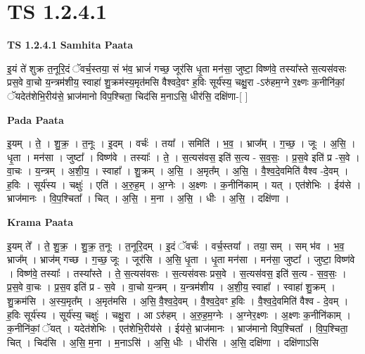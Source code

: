 \documentclass[17pt]{extarticle}
\begin{document}
\section{ TS 1.2.4.1 }

\textbf{TS 1.2.4.1 } \newline
\textbf{Samhita Paata} \newline

इ॒यं ते॑ शुक्र त॒नूरि॒दं ॅवर्च॒स्तया॒ सं भ॑व॒ भ्राजं॑ गच्छ॒ जूर॑सि धृ॒ता मन॑सा॒ जुष्टा॒ विष्ण॑वे॒ तस्या᳚स्ते स॒त्यस॑वसः प्रस॒वे वा॒चो य॒न्त्रम॑शीय॒ स्वाहा॑ शु॒क्रम॑स्य॒मृत॑मसि वैश्वदे॒वꣳ ह॒विः सूर्य॑स्य॒ चक्षु॒रा -ऽरु॑हम॒ग्ने र॒क्ष्णः क॒नीनि॑कां॒ ॅयदेत॑शेभि॒रीय॑से॒ भ्राज॑मानो विप॒श्चिता॒ चिद॑सि म॒नाऽसि॒ धीर॑सि॒ दक्षि॑णा-[ ] \newline

\textbf{Pada Paata} \newline

इ॒यम् । ते॒ । शु॒क्र॒ । त॒नूः । इ॒दम् । वर्चः॑ । तया᳚ । समिति॑ । भ॒व॒ । भ्राज᳚म् । ग॒च्छ॒ । जूः । अ॒सि॒ । धृ॒ता । मन॑सा । जुष्टा᳚ । विष्ण॑वे । तस्याः᳚ । ते॒ । स॒त्यस॑वस॒ इति॑ स॒त्य - स॒व॒सः॒ । प्र॒स॒वे इति॑ प्र -स॒वे । वा॒चः । य॒न्त्रम् । अ॒शी॒य॒ । स्वाहा᳚ । शु॒क्रम् । अ॒सि॒ । अ॒मृत᳚म् । अ॒सि॒ । वै॒श्व॒दे॒वमिति॑ वैश्व -दे॒वम् । ह॒विः । सूर्य॑स्य । चक्षुः॑ । एति॑ । अ॒रु॒ह॒म् । अ॒ग्नेः । अ॒क्ष्णः । क॒नीनि॑काम् । यत् । एत॑शेभिः । ईय॑से । भ्राज॑मानः । वि॒प॒श्चिता᳚ । चित् । अ॒सि॒ । म॒ना । अ॒सि॒ । धीः । अ॒सि॒ । दक्षि॑णा ।  \newline


\textbf{Krama Paata} \newline

इ॒यम् ते᳚ । ते॒ शु॒क्र॒ । शु॒क्र॒ त॒नूः । त॒नूरि॒दम् । इ॒दं ॅवर्चः॑ । वर्च॒स्तया᳚ । तया॒ सम् । सम् भ॑व । भ॒व॒ भ्राज᳚म् । भ्राज॑म् गच्छ । ग॒च्छ॒ जूः । जूर॑सि । अ॒सि॒ धृ॒ता । धृ॒ता मन॑सा । मन॑सा॒ जुष्टा᳚ । जुष्टा॒ विष्ण॑वे । विष्ण॑वे॒ तस्याः᳚ । तस्या᳚स्ते । ते॒ स॒त्यस॑वसः । स॒त्यस॑वसः प्रस॒वे । स॒त्यस॑वस॒ इति॑ स॒त्य - स॒व॒सः॒ । प्र॒स॒वे वा॒चः । प्र॒स॒व इति॑ प्र - स॒वे । वा॒चो य॒न्त्रम् । य॒न्त्रम॑शीय । अ॒शी॒य॒ स्वाहा᳚ । स्वाहा॑ शु॒क्रम् । शु॒क्रम॑सि । अ॒स्य॒मृत᳚म् । अ॒मृत॑मसि । अ॒सि॒ वै॒श्व॒दे॒वम् । वै॒श्व॒दे॒वꣳ ह॒विः । वै॒श्व॒दे॒वमिति॑ वैश्व - दे॒वम् । ह॒विः सूर्य॑स्य । सूर्य॑स्य॒ चक्षुः॑ । चक्षु॒रा । आ ऽरु॑हम् । अ॒रु॒ह॒म॒ग्नेः । अ॒ग्नेर॒क्ष्णः । अ॒क्ष्णः क॒नीनि॑काम् । क॒नीनि॑कां॒ ॅयत् । यदेत॑शेभिः । एत॑शेभि॒रीय॑से । ईय॑से॒ भ्राज॑मानः । भ्राज॑मानो विप॒श्चिता᳚ । वि॒प॒श्चिता॒ चित् । चिद॑सि । अ॒सि॒ म॒ना । म॒नाऽसि॑ । अ॒सि॒ धीः । धीर॑सि । अ॒सि॒ दक्षि॑णा । दक्षि॑णाऽसि \newline
\end{document}
